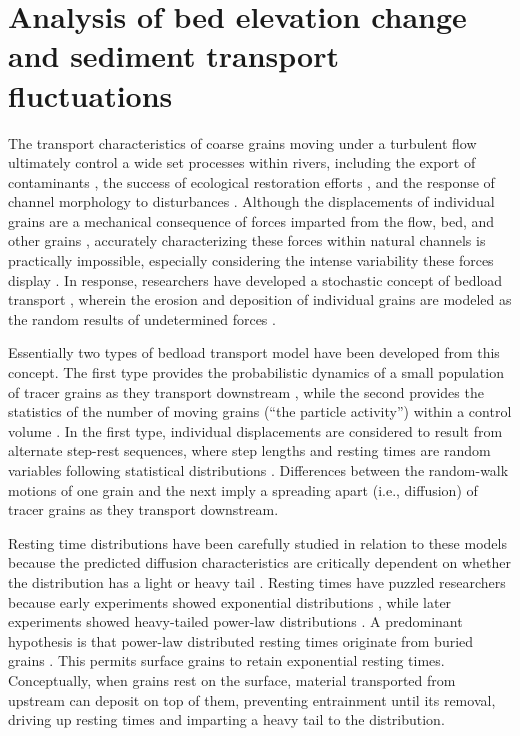 
\chapter{Analysis of bed elevation change and sediment transport fluctuations}
\label{ch:ch3}

The transport characteristics of coarse grains moving under a turbulent flow ultimately control a wide set processes within rivers, including the export of contaminants \citep{Malmon2005,Macklin2006}, the success of ecological restoration efforts \citep{Gaeuman2017}, and the response of channel morphology to disturbances \citep{Hassan2017}.
Although the displacements of individual grains are a mechanical consequence of forces imparted from the flow, bed, and other grains \citep{Wiberg1985, Vowinckel2014,Gonzalez2017}, accurately characterizing these forces within natural channels is practically impossible, especially considering the intense variability these forces display \citep{Schmeeckle2007,Celik2010, Dwivedi2011}.
In response, researchers have developed a stochastic concept of bedload transport \citep{Einstein1937}, wherein the erosion and deposition of individual grains are modeled as the random results of undetermined forces \citep{Einstein1950,Paintal1971,Ancey2006}.

Essentially two types of bedload transport model have been developed from this concept.
The first type provides the probabilistic dynamics of a small population of tracer grains as they transport downstream \citep{Einstein1937,Hubbell1964, Nakagawa1976,Martin2012,Lajeunesse2017,Wu2019}, while the second provides the statistics of the number of moving grains (``the particle activity'') within a control volume \citep{Einstein1950,Ancey2006,Furbish2012a}.
In the first type, individual displacements are considered to result from alternate step-rest sequences, where step lengths and resting times are random variables following statistical distributions \citep{Einstein1937}. 
Differences between the random-walk motions of one grain and the next imply a spreading apart (i.e., diffusion) of tracer grains as they transport downstream.

Resting time distributions have been carefully studied in relation to these models because the predicted diffusion characteristics are critically dependent on whether the distribution has a light or heavy tail \citep{Bradley2017,Martin2012,Weeks1998}.
Resting times have puzzled researchers because early experiments showed exponential distributions \citep{Einstein1937,Hubbell1964, Yano1969,Yano1969a,Nakagawa1976}, while later experiments showed heavy-tailed power-law distributions \citep{Martin2012,Voepel2013, Olinde2015, Pretzlav2016a, Bradley2017, Liu2019}.
A predominant hypothesis is that power-law distributed resting times originate from buried grains \citep{Martin2014,Voepel2013}. This permits surface grains to retain exponential resting times. 
Conceptually, when grains rest on the surface, material transported from upstream can deposit on top of them, preventing entrainment until its removal, driving up resting times and imparting a heavy tail to the distribution.

